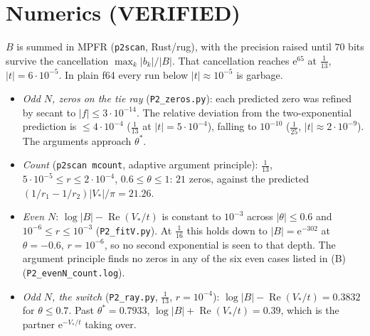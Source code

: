 \documentclass[11pt]{article}
\theoremstyle{remark}\newtheorem{remark}[theorem]{Remark}
\newcommand{\e}{\mathrm{e}}
\begin{document}
\section{Numerics (VERIFIED)}
$B$ is summed in MPFR (\texttt{p2scan}, Rust/rug), with the precision raised until $70$ bits survive the cancellation
$\max_k|b_k|/|B|$. That cancellation reaches $\e^{65}$ at $\frac1{13}$, $|t|=6\cdot10^{-5}$. In plain f64 every run below $|t|\approx10^{-5}$ is garbage.
\begin{itemize}
\item \emph{Odd $N$, zeros on the tie ray} (\texttt{P2\_zeros.py}): each predicted zero was refined by secant to $|f|\le3\cdot10^{-14}$. The relative
deviation from the two-exponential prediction is $\le4\cdot10^{-4}$ ($\frac1{13}$ at $|t|=5\cdot10^{-4}$), falling to $10^{-10}$ ($\frac1{25}$,
$|t|\approx2\cdot10^{-9}$). The arguments approach $\theta^*$.
\item \emph{Count} (\texttt{p2scan mcount}, adaptive argument principle): $\frac1{13}$, $5\cdot10^{-5}\le r\le2\cdot10^{-4}$,
$0.6\le\theta\le1$: $21$ zeros, against the predicted $(1/r_1-1/r_2)|V_*|/\pi=21.26$.
\item \emph{Even $N$}: $\log|B|-\operatorname{Re}(V_*/t)$ is constant to $10^{-3}$ across $|\theta|\le0.6$ and $10^{-6}\le r\le10^{-3}$
(\texttt{P2\_fitV.py}). At $\frac1{16}$ this holds down to $|B|=\e^{-302}$ at $\theta=-0.6$, $r=10^{-6}$, so no second exponential is seen to
that depth. The argument principle finds no zeros in any of the six even cases listed in (B) (\texttt{P2\_evenN\_count.log}).
\item \emph{Odd $N$, the switch} (\texttt{P2\_ray.py}, $\frac1{13}$, $r=10^{-4}$): $\log|B|-\operatorname{Re}(V_*/t)=0.3832$ for
$\theta\le0.7$. Past $\theta^*=0.7933$, $\log|B|+\operatorname{Re}(V_*/t)=0.39$, which is the partner $\e^{-V_*/t}$ taking over.
\end{itemize}
\end{document}
